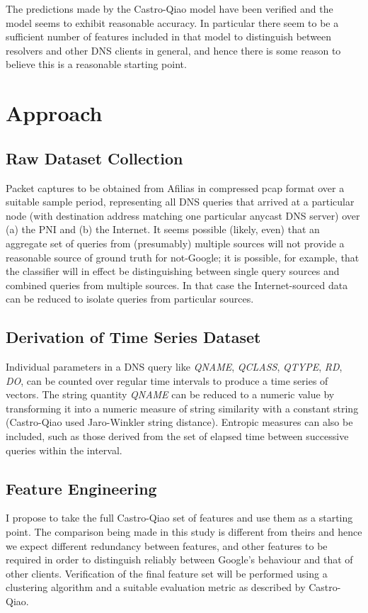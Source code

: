 \documentclass[9pt,technote,letterpaper]{IEEEtran}
\begin{document}
The predictions made by the Castro-Qiao model have been verified and the model seems to exhibit reasonable accuracy. In particular there seem to be a sufficient number of features included in that model to distinguish between resolvers and other DNS clients in general, and hence there is some reason to believe this is a reasonable starting point.

\section{Approach}
\subsection{Raw Dataset Collection}
Packet captures to be obtained from Afilias in compressed pcap format over a suitable sample period, representing all DNS queries that arrived at a particular node (with destination address matching one particular anycast DNS server) over (a) the PNI and (b) the Internet. It seems possible (likely, even) that an aggregate set of queries from (presumably) multiple sources will not provide a reasonable source of ground truth for not-Google; it is possible, for example, that the classifier will in effect be distinguishing between single query sources and combined queries from multiple sources. In that case the Internet-sourced data can be reduced to isolate queries from particular sources.

\subsection{Derivation of Time Series Dataset}
Individual parameters in a DNS query like \emph{QNAME}, \emph{QCLASS}, \emph{QTYPE}, \emph{RD}, \emph{DO}, can be counted over regular time intervals to produce a time series of vectors. The string quantity \emph{QNAME} can be reduced to a numeric value by transforming it into a numeric measure of string similarity with a constant string (Castro-Qiao used Jaro-Winkler string distance). Entropic measures can also be included, such as those derived from the set of elapsed time between successive queries within the interval.

\subsection{Feature Engineering}
I propose to take the full Castro-Qiao set of features and use them as a starting point. The comparison being made in this study is different from theirs and hence we expect different redundancy between features, and other features to be required in order to distinguish reliably between Google's behaviour and that of other clients. Verification of the final feature set will be performed using a clustering algorithm and a suitable evaluation metric as described by Castro-Qiao.
\end{document}

